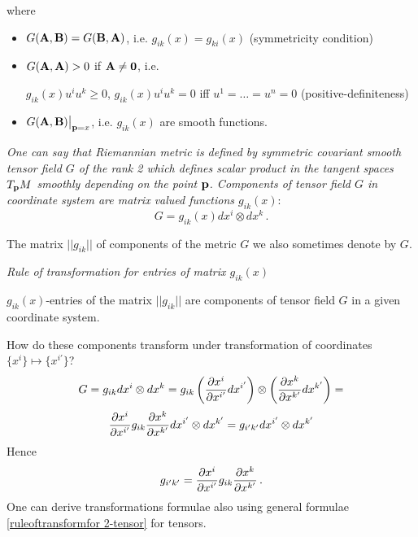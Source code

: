\documentclass[12pt]{article}
\theoremstyle{theorem}
\numberwithin{equation}{section}
\begin{document}
where
\begin{itemize}

  \item  $G({\bf A},{\bf B})=G({\bf B},{\bf A})$, i.e.  $g_{ik}(x)=g_{ki}(x)$ (symmetricity condition)

    \item
       $G({\bf A},{\bf A})>0$ if $\bf A\not=0$, i.e.

    $g_{ik}(x)u^iu^k\geq 0$, $g_{ik}(x)u^iu^k=0$ iff $u^1=\dots=u^n=0$  (positive-definiteness)

   \item  $G({\bf A},{\bf B})\big\vert_{{\bf p}=x}$, i.e. $g_{ik}(x)$ are smooth functions.


\end{itemize}


{\it One can say that Riemannian metric is defined by  symmetric covariant smooth tensor field $G$ of the rank 2
which defines scalar product in the tangent spaces $T_{{\bf p}}M$ smoothly depending on the point ${\bf p}$.
 Components of tensor field  $G$ in coordinate system are matrix valued functions $g_{ik}(x)$}:
\begin{equation}\label{symb}
    G=g_{ik}(x)dx^i\otimes dx^k\,.
\end{equation}

  \m

 The matrix $||g_{ik}||$ of components of the metric $G$ we also sometimes denote by $G$.

    {\it Rule of transformation for entries of matrix $g_{ik}(x)$}

  $g_{ik}(x)$-entries of the matrix $||g_{ik}||$  are components of tensor field $G$ in a given coordinate system.

    How do these components transform under transformation of coordinates $\{x^{i}\}\mapsto \{x^{i'}\}$?
    \begin{equation*}
        G=g_{ik}dx^i\otimes dx^k=g_{ik}
        \left({\partial x^i\over \partial x^{i'}}dx^{i'}\right)
        \otimes
        \left({\partial x^k\over \partial x^{k'}}dx^{k'}\right)=
    \end{equation*}
    \begin{equation*}\label{ruleoftransformation}
         {\partial x^i\over \partial x^{i'}}g_{ik}{\partial x^k\over \partial x^{k'}}
        dx^{i'}
        \otimes dx^{k'}=
        g_{i'k'}
        dx^{i'}
        \otimes dx^{k'}
            \end{equation*}
    Hence
    \begin{equation}\label{transformationlaw}
     g_{i'k'}={\partial x^i\over \partial x^{i'}}g_{ik}{\partial x^k\over \partial x^{k'}}\,.
       \end{equation}
     One can derive transformations formulae also
     using general formulae \eqref{ruleoftransformfor 2-tensor} for tensors.
\end{document}
